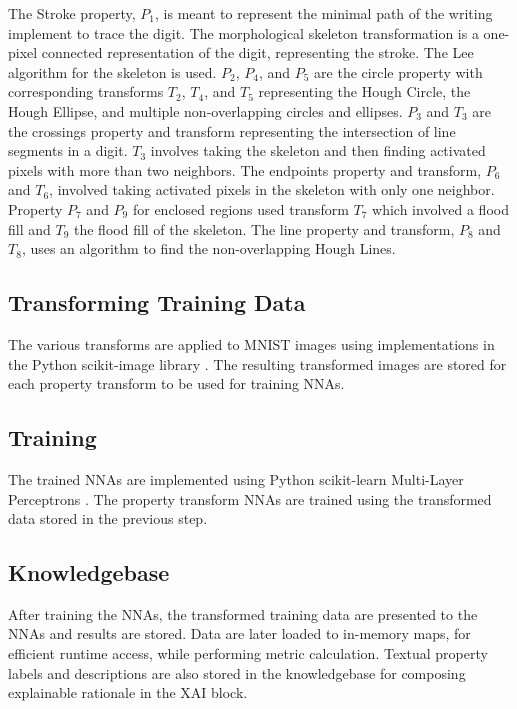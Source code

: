 \documentclass[conference]{IEEEtran}
\begin{document}
The Stroke property, $P_1$, is meant to represent the minimal path of the
writing implement to trace the digit.  The morphological skeleton transformation
is a one-pixel connected representation of the digit,  representing the stroke.
The Lee\cite{Lee1994} algorithm for the skeleton is used. $P_2$, $P_4$, and
$P_5$ are the circle property with corresponding transforms $T_2$, $T_4$, and
$T_5$ representing the Hough Circle, the Hough Ellipse, and multiple
non-overlapping circles and ellipses. $P_3$ and $T_3$ are the crossings property
and transform representing the intersection of line segments in a digit.  $T_3$
involves taking the skeleton and then finding activated pixels with more than
two neighbors.   The endpoints property and transform, $P_6$ and $T_6$, involved
taking activated pixels in the skeleton with only one neighbor. Property $P_7$
and $P_9$ for enclosed regions used transform $T_7$ which involved a flood fill
and $T_9$ the flood fill of the skeleton.  The line property and transform,
$P_8$ and $T_8$, uses an algorithm to find the non-overlapping Hough Lines.

\subsection{Transforming Training Data}

The various transforms are applied to MNIST images using implementations in the
Python scikit-image library \cite{scikitimage}.  The resulting transformed
images are stored for each property transform to be used for training NNAs.

\subsection{Training}

The trained NNAs are implemented using Python scikit-learn Multi-Layer
Perceptrons \cite{scikitlearn}.  The property transform NNAs are trained using
the transformed data stored in the previous step.

\subsection{Knowledgebase}

After training the NNAs, the transformed training data are presented to the NNAs
and results are stored.  Data are later loaded to in-memory maps,  for efficient
runtime access, while performing metric calculation.  Textual property labels
and descriptions are also stored in the knowledgebase for composing explainable
rationale in the XAI block.
\end{document}
